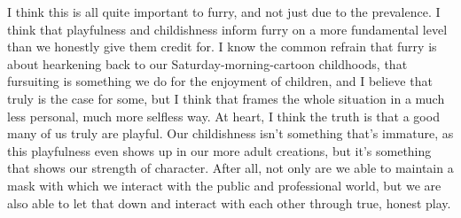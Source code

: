 I think this is all quite important to furry, and not just due to the
prevalence. I think that playfulness and childishness inform furry on a
more fundamental level than we honestly give them credit for. I know the
common refrain that furry is about hearkening back to our
Saturday-morning-cartoon childhoods, that fursuiting is something we do
for the enjoyment of children, and I believe that truly is the case for
some, but I think that frames the whole situation in a much less
personal, much more selfless way. At heart, I think the truth is that a
good many of us truly are playful. Our childishness isn't something
that's immature, as this playfulness even shows up in our more adult
creations, but it's something that shows our strength of character.
After all, not only are we able to maintain a mask with which we
interact with the public and professional world, but we are also able to
let that down and interact with each other through true, honest play.
